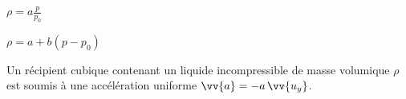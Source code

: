 
\begin{enonce}
$\rho=a\frac{p}{p_0}$
\end{enonce}





\begin{enonce}
$\rho=a+b(p-p_0)$
\end{enonce}





\finEntrainement


\hauteurLargeurCadreReponse		{8mm}{5cm}
\typeEntrainement				{} %
\initialisationEntrainement

                                \initialisationPartieGauche %
Un récipient cubique contenant un liquide incompressible de masse volumique $\rho$ est soumis à une accélération uniforme $\vv{a}=-a \, \vv{u_y}$. 

